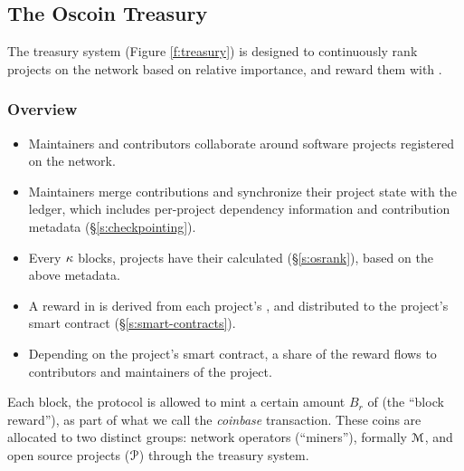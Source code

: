 \begin{figure*}[!ht]
    \par\medskip\noindent\minipage{\linewidth}
    \centering
    
    \caption{The Oscoin Treasury System\label{f:treasury}}
    \endminipage\par\medskip
\end{figure*}

\subsection{The Oscoin Treasury}
\label{s:treasury}

The treasury system (Figure \ref{f:treasury}) is designed to continuously
rank projects on the network based on relative importance, and reward them with
\oscoin{}.

\subsubsection{Overview}

\begin{itemize}
    \item Maintainers and contributors collaborate around software projects
        registered on the network.
    \item Maintainers merge contributions and synchronize their project state
        with the ledger, which includes per-project dependency information and
        contribution metadata (\S\ref{s:checkpointing}).
    \item Every $\kappa$ blocks, projects have their \osrank{} calculated
        (\S\ref{s:osrank}), based on the above metadata.
    \item A reward in \oscoin{} is derived from each project's \osrank{},
        and distributed to the project's smart contract (\S\ref{s:smart-contracts}).
    \item Depending on the project's smart contract, a share of the reward flows
        to contributors and maintainers of the project.
\end{itemize}

\medskip

\noindent Each block, the protocol is allowed to mint a certain amount $B_r$ of \oscoin{}
(the ``block reward''), as part of what we call the \emph{coinbase}
transaction. These coins are allocated to two distinct groups: network
operators (``miners''), formally $\mathcal{M}$, and open source projects ($\mathcal{P}$)
through the treasury system.

